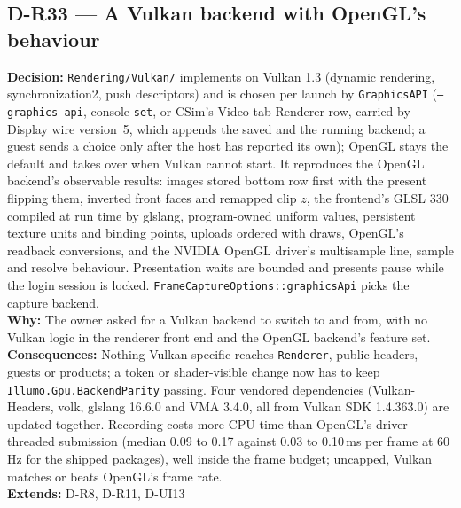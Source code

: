 \subsection*{D-R33 --- A Vulkan backend with OpenGL's behaviour}
\begin{decisionbox}[title={D-R33 \quad 2026-09-30}]
\textbf{Decision:} \texttt{Rendering/Vulkan/} implements 
on Vulkan 1.3 (dynamic rendering, synchronization2, push descriptors) and is
chosen per launch by \texttt{GraphicsAPI} (\texttt{--graphics-api}, console
\texttt{set}, or CSim's Video tab Renderer row, carried by Display wire
version~5, which appends the saved and the running backend; a guest sends a
choice only after the host has reported its own); OpenGL stays the default and
takes over when Vulkan cannot start. It reproduces the OpenGL backend's observable results: images stored
bottom row first with the present flipping them, inverted front faces and
remapped clip $z$, the frontend's GLSL 330 compiled at run time by glslang,
program-owned uniform values, persistent texture units and binding points,
uploads ordered with draws, OpenGL's readback conversions, and the NVIDIA
OpenGL driver's multisample line, sample and resolve behaviour. Presentation
waits are bounded and presents pause while the login session is locked.
\texttt{FrameCaptureOptions::graphicsApi} picks the capture backend.\\
\textbf{Why:} The owner asked for a Vulkan backend to switch to and from, with
no Vulkan logic in the renderer front end and the OpenGL backend's feature
set.\\
\textbf{Consequences:} Nothing Vulkan-specific reaches \texttt{Renderer},
public headers, guests or products; a token or shader-visible change now has
to keep \texttt{Illumo.Gpu.BackendParity} passing. Four vendored dependencies
(Vulkan-Headers, volk, glslang 16.6.0 and VMA 3.4.0, all from Vulkan SDK
1.4.363.0) are updated together. Recording costs more CPU time than OpenGL's
driver-threaded submission (median 0.09 to 0.17 against 0.03 to 0.10\,ms per
frame at 60\,Hz for the shipped packages), well inside the frame budget;
uncapped, Vulkan matches or beats OpenGL's frame rate.\\
\textbf{Extends:} D-R8, D-R11, D-UI13
\end{decisionbox}

